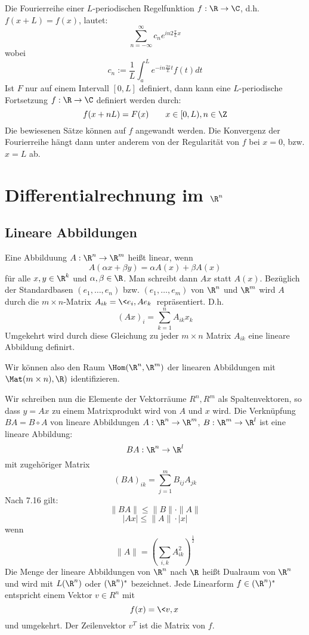 \documentclass{mycourse}
\begin{document}
\begin{note}[Schlussbemerkungen]
Die Fourierreihe einer $L$-periodischen Regelfunktion $f:\R\to\C$, d.h. $f(x+L)=f(x)$,
lautet:
\[
\sum_{n=-\infty}^\infty c_ne^{in2\frac\pi Lx}
\]
wobei
\[
c_n:= \frac 1L \int_{a}^Le^{-in\frac{2\pi}Lt}f(t)dt
\]
Ist $F$ nur auf einem Intervall $[0,L]$ definiert, dann kann eine $L$-periodische Fortsetzung
$f:\R\to\C$ definiert werden durch:
\[
f(x+nL)=F(x) \qquad x\in[0,L), n\in\Z
\]
Die bewiesenen Sätze können auf $f$ angewandt werden.
Die Konvergenz der Fourierreihe hängt dann unter anderem von der Regularität von $f$ bei $x=0$, bzw. $x=L$ ab.
\end{note}

\chapter{Differentialrechnung im $\R^n$}

\section{Lineare Abbildungen}
Eine Abbilduung $A:\R^n\to\R^m$ heißt linear, wenn
\[
A(\alpha x+\beta y)=\alpha A(x)+\beta A(x)
\]
für alle $x,y \in \R^k$ und $\alpha,\beta\in\R$.
Man schreibt dann $Ax$ statt $A(x)$.
Bezüglich der Standardbasen $(e_1,\dotsc,e_n)$ bzw. $(e_1,\dotsc,e_m)$ von $\R^n$ und $\R^m$ wird
$A$ durch die $m\times n$-Matrix $A_{ik}=\<e_{i},Ae_k\>$ repräsentiert.
D.h.
\[
(Ax)_i=\sum_{k=1}^nA_{ik}x_k
\]
Umgekehrt wird durch diese Gleichung zu jeder $m\times n$ Matrix $A_{ik}$ eine lineare Abbildung definirt.

Wir können also den Raum $\Hom(\R^n,\R^m)$ der linearen Abbildungen mit $\Mat(m\times n),\R)$ identifizieren.

Wir schreiben nun die Elemente der Vektorräume $R^n, R^m$ als Spaltenvektoren, so dass $y=Ax$ zu einem Matrixprodukt wird von $A$ und $x$ wird.
Die Verknüpfung $BA = B\circ A$ von lineare Abbildungen $A:\R^n\to\R^m$, $B:\R^m\to\R^l$ ist eine lineare Abbildung:
\[
BA: \R^n\to\R^l
\]
mit zugehöriger Matrix
\[
(BA)_{ik}=\sum_{j=1}^m B_{ij}A_{jk}
\]
Nach 7.16 gilt:
\[
\|BA\|\le \|B\|\cdot \|A\|
\]
\[
|Ax|\le \|A\|\cdot |x|
\]
wenn
\[
\|A\|=\left(\sum_{i,k}A_{ik}^2\right)^{\frac 12}
\]
Die Menge der lineare Abbildungen von $\R^n$ nach $\R$ heißt Dualraum von $\R^n$ und wird mit $L(\R^n)$ oder $(\R^n)^*$ bezeichnet.
Jede Linearform $f\in(\R^n)^*$ entspricht einem Vektor $v\in R^n$ mit
\[
f(x)=\<v,x\>
\]
und umgekehrt.
Der Zeilenvektor $v^T$ ist die Matrix von $f$.
\end{document}
